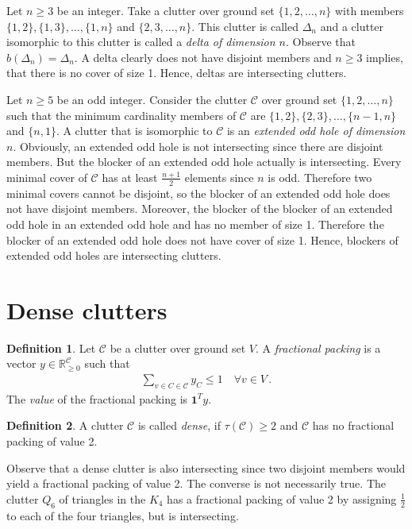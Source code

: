 \documentclass[a4paper, 12pt, twoside=false]{scrbook}
\theoremstyle{definition}
\newtheorem*{definition}{Definition}
\newcommand*{\IR}{\ensuremath{\mathbb{R}}}
\begin{document}
Let $n \geq 3$ be an integer.
Take a clutter over ground set $\{1,2,\ldots,n\}$ with members $\{1,2\},\{1,3\},\ldots,\{1,n\}$ and $\{2,3,\ldots,n\}$.
This clutter is called $\Delta_n$ and a clutter isomorphic to this clutter is called a \emph{delta of dimension $n$}\cite{deltadefinition}.
Observe that $b(\Delta_n)=\Delta_n$.
A delta clearly does not have disjoint members and $n\geq 3$ implies, that there is no cover of size 1.
Hence, deltas are intersecting clutters.

Let $n\geq 5$ be an odd integer.
Consider the clutter $\mathcal{C}$ over ground set $\{1,2,\ldots,n\}$ such that the minimum cardinality members of $\mathcal{C}$ are $\{1,2\},\{2,3\},\ldots,\{n-1,n\}$ and $\{n,1\}$.
A clutter that is isomorphic to $\mathcal{C}$ is an \emph{extended odd hole of dimension $n$}\cite{deltas}.
Obviously, an extended odd hole is not intersecting since there are disjoint members.
But the blocker of an extended odd hole actually is intersecting.
Every minimal cover of $\mathcal{C}$ has at least $\frac{n+1}2$ elements since $n$ is odd.
Therefore two minimal covers cannot be disjoint, so the blocker of an extended odd hole does not have disjoint members.
Moreover, the blocker of the blocker of an extended odd hole in an extended odd hole and has no member of size 1.
Therefore the blocker of an extended odd hole does not have cover of size 1.
Hence, blockers of extended odd holes are intersecting clutters.

\section{Dense clutters}
\begin{definition}
    Let $\mathcal{C}$ be a clutter over ground set $V$.
    A \emph{fractional packing} is a vector $y \in \IR_{\geq0}^{\mathcal{C}}$ such that
    \begin{align*}
        \sum_{v \in C \in \mathcal{C}} y_C \leq 1 \quad \forall v \in V \,.
    \end{align*}
    The \emph{value} of the fractional packing is $\textbf{1}^Ty$.
\end{definition}
\begin{definition}
    A clutter $\mathcal{C}$ is called \emph{dense}, if $\tau(\mathcal{C}) \geq 2$ and $\mathcal{C}$ has no fractional packing of value 2.
\end{definition}

Observe that a dense clutter is also intersecting since two disjoint members would yield a fractional packing of value 2.
The converse is not necessarily true.
The clutter $Q_6$ of triangles in the $K_4$ has a fractional packing of value 2 by assigning $\frac 12$ to each of the four triangles, but is intersecting.
\end{document}
